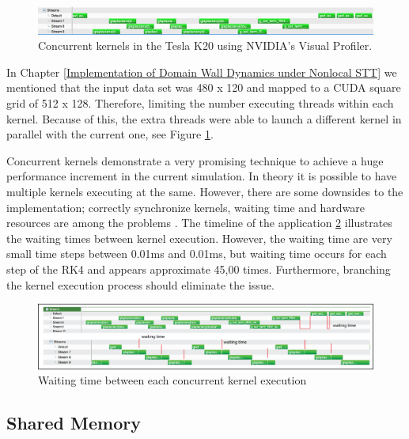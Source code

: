 \begin{figure}[htbp]
	\centering
		\includegraphics[width=1.0\textwidth]{Figures/concurent.png}
		\smallskip
	\caption[Streams kernels Tesla K20]{Concurrent kernels in the Tesla K20 using NVIDIA's Visual Profiler.}
	\label{fig:concurrent}
\end{figure}

In Chapter \ref{Implementation of Domain Wall Dynamics under Nonlocal STT} we mentioned that the input data set was 480 x 120 and mapped to a CUDA square grid of 512 x 128. Therefore, limiting the number executing threads within each kernel. Because of this, the extra threads were able to launch a different kernel in parallel with the current one, see Figure  \ref{fig:concurrent}.

Concurrent kernels demonstrate a very promising technique to achieve a huge performance increment in the current simulation. In theory it is possible to have multiple kernels executing at the same. However, there are some downsides to the implementation; correctly synchronize kernels, waiting time and hardware resources are among the  problems \cite{practices}. The timeline of the application \ref{fig:waittime} illustrates the waiting times between kernel execution. However, the waiting time are very small time steps between 0.01ms and 0.01ms, but waiting time occurs for each step of the RK4 and appears approximate 45,00 times. Furthermore, branching the kernel execution process should eliminate the issue.

\begin{figure}[htbp]
	\centering
		\includegraphics[width=1.0\textwidth]{Figures/waittime.png}
		\smallskip
	\caption[Waiting time in concurrent kernels]{Waiting time between each concurrent kernel execution}
	\label{fig:waittime}
\end{figure}


\subsection{Shared Memory}

